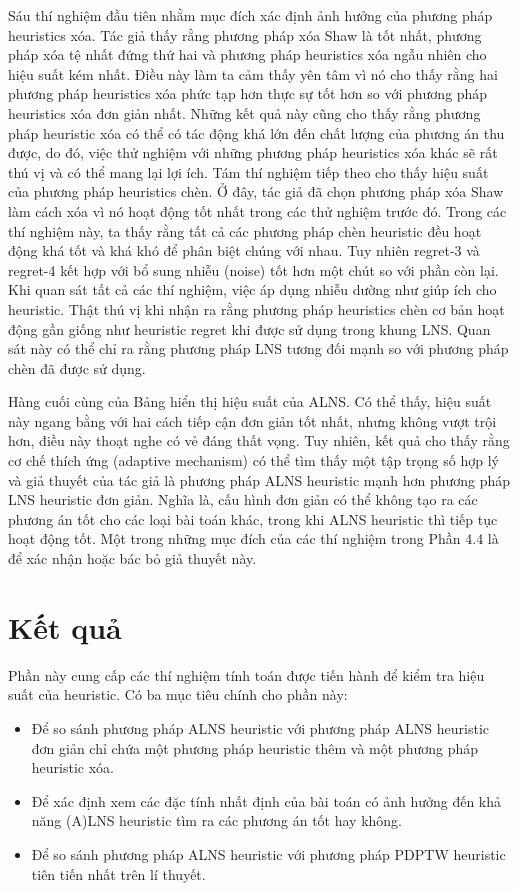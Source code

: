 Sáu thí nghiệm đầu tiên nhằm mục đích xác định ảnh hưởng của phương pháp heuristics xóa. Tác giả thấy rằng phương pháp xóa Shaw là tốt nhất, phương pháp xóa tệ nhất đứng thứ hai và phương pháp heuristics xóa ngẫu nhiên cho hiệu suất kém nhất. Điều này làm ta cảm thấy yên tâm vì nó cho thấy rằng hai phương pháp heuristics xóa phức tạp hơn thực sự tốt hơn so với phương pháp heuristics xóa đơn giản nhất. Những kết quả này cũng cho thấy rằng phương pháp heuristic xóa có thể có tác động khá lớn đến chất lượng của phương án thu được, do đó, việc thử nghiệm với những phương pháp heuristics xóa khác sẽ rất thú vị và có thể mang lại lợi ích.
Tám thí nghiệm tiếp theo cho thấy hiệu suất của phương pháp heuristics chèn. Ở đây, tác giả đã chọn phương pháp xóa Shaw làm cách xóa vì nó hoạt động tốt nhất trong các thử nghiệm trước đó. Trong các thí nghiệm này, ta thấy rằng tất cả các phương pháp  chèn heuristic đều hoạt động khá tốt và khá khó để phân biệt chúng với nhau. Tuy nhiên regret-3 và regret-4 kết hợp với bổ sung nhiễu (noise) tốt hơn một chút so với phần còn lại. Khi quan sát tất cả các thí nghiệm, việc áp dụng nhiễu dường như giúp ích cho heuristic. Thật thú vị khi nhận ra rằng phương pháp heuristics chèn cơ bản hoạt động gần giống như heuristic regret khi được sử dụng trong khung LNS. Quan sát này có thể chỉ ra rằng phương pháp LNS tương đối mạnh so với phương pháp chèn đã được sử dụng.

Hàng cuối cùng của Bảng hiển thị hiệu suất của ALNS. Có thể thấy, hiệu suất này ngang bằng với hai cách tiếp cận đơn giản tốt nhất, nhưng không vượt trội hơn, điều này thoạt nghe có vẻ đáng thất vọng. Tuy nhiên, kết quả cho thấy rằng cơ chế thích ứng (adaptive mechanism) có thể tìm thấy một tập trọng số hợp lý và giả thuyết của tác giả là phương pháp ALNS heuristic mạnh hơn phương pháp LNS heuristic đơn giản. Nghĩa là, cấu hình đơn giản có thể không tạo ra các phương án tốt cho các loại bài toán khác, trong khi ALNS heuristic thì tiếp tục hoạt động tốt.
Một trong những mục đích của các thí nghiệm trong Phần 4.4 là để xác nhận hoặc bác bỏ giả thuyết này.

\section{Kết quả}
Phần này cung cấp các thí nghiệm tính toán được tiến hành để kiểm tra hiệu suất của heuristic. Có ba mục tiêu chính cho phần này:
\begin{itemize}
    \item Để so sánh phương pháp ALNS heuristic với phương pháp ALNS heuristic đơn giản chỉ chứa một phương pháp heuristic thêm và một phương pháp heuristic xóa.
    \item Để xác định xem các đặc tính nhất định của bài toán có ảnh hưởng đến khả năng (A)LNS heuristic tìm ra các phương án tốt hay không.
    \item Để so sánh phương pháp ALNS heuristic với phương pháp PDPTW heuristic tiên tiến nhất trên lí thuyết.
\end{itemize}

